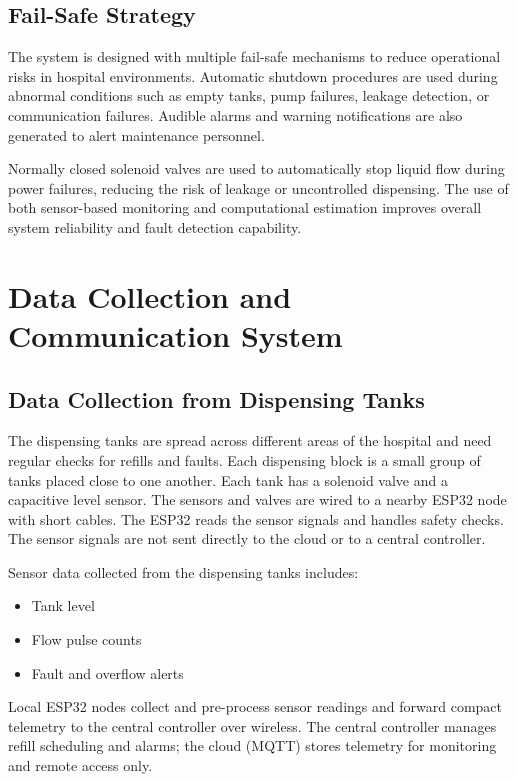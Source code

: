 \documentclass[12pt,a4paper]{report}
\begin{document}
\section{Fail-Safe Strategy}

The system is designed with multiple fail-safe mechanisms to reduce operational risks in hospital environments. Automatic shutdown procedures are used during abnormal conditions such as empty tanks, pump failures, leakage detection, or communication failures. Audible alarms and warning notifications are also generated to alert maintenance personnel.

Normally closed solenoid valves are used to automatically stop liquid flow during power failures, reducing the risk of leakage or uncontrolled dispensing. The use of both sensor-based monitoring and computational estimation improves overall system reliability and fault detection capability.




\chapter[Data Collection and Communication System]{Data Collection and\\Communication System}

\section{Data Collection from Dispensing Tanks}

The dispensing tanks are spread across different areas of the hospital and need regular checks for refills and faults. Each dispensing block is a small group of tanks placed close to one another. Each tank has a solenoid valve and a capacitive level sensor. The sensors and valves are wired to a nearby ESP32 node with short cables. The ESP32 reads the sensor signals and handles safety checks. The sensor signals are not sent directly to the cloud or to a central controller.

\noindent Sensor data collected from the dispensing tanks includes:

\begin{itemize}
       \item Tank level
       \item Flow pulse counts
       \item Fault and overflow alerts
\end{itemize}

Local ESP32 nodes collect and pre-process sensor readings and forward compact telemetry to the central controller over wireless. The central controller manages refill scheduling and alarms; the cloud (MQTT) stores telemetry for monitoring and remote access only.
\end{document}
